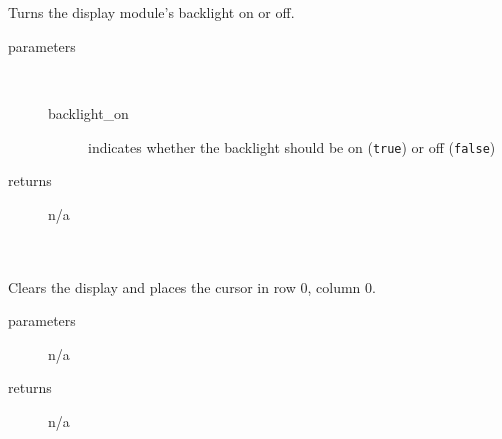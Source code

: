 \begin{itemize}
{             \\ \\
                Turns the display module's backlight on or off.
                \begin{description}
                    \item[parameters] \
                    \begin{description}
                        \item[backlight\_on] indicates whether the backlight should be on (\lstinline{true}) or off (\lstinline{false})
                    \end{description}
                    \item[returns] n/a
                \end{description}

             \\ \\
                Clears the display and places the cursor in row 0, column 0.
                \begin{description}
                    \item[parameters] n/a
                    \item[returns] n/a
                \end{description}
        }{}

    \end{itemize}